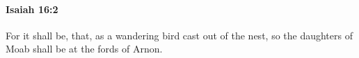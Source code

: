 
		\paragraph{Isaiah 16:2} %
			\label{ISAIAH-16-2}

			For it shall be, that, as a wandering bird cast out of the nest, so the daughters of Moab shall be at the fords of Arnon.


